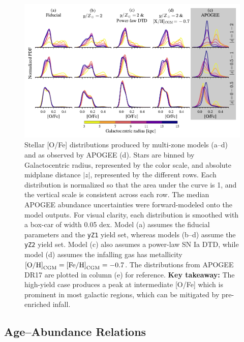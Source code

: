 \documentclass[twocolumn,twocolappendix,linenumbers]{aastex631}
\begin{document}
\begin{figure}
    \centering
    \includegraphics{src/tex/figures/ofe_df_comparison.pdf}
    \caption{Stellar [O/Fe] distributions produced by multi-zone models (a--d) and as observed by APOGEE (d). Stars are binned by Galactocentric radius, represented by the color scale, and absolute midplane distance $|z|$, represented by the different rows. Each distribution is normalized so that the area under the curve is 1, and the vertical scale is consistent across each row. The median APOGEE abundance uncertainties were forward-modeled onto the model outputs. For visual clarity, each distribution is smoothed with a box-car of width 0.05 dex. Model (a) assumes the fiducial parameters and the {\tt yZ1} yield set, whereas models (b--d) assume the {\tt yZ2} yield set. Model (c) also assumes a power-law SN Ia DTD, while model (d) assumes the infalling gas has metallicity ${\rm [O/H]}_{\rm CGM}={\rm [Fe/H]}_{\rm CGM}=-0.7$. The distributions from APOGEE DR17 are plotted in column (e) for reference. {\bf Key takeaway:} The high-yield case produces a peak at intermediate [O/Fe] which is prominent in most galactic regions, which can be mitigated by pre-enriched infall.}
    \label{fig:ofe-df-yields}
\end{figure}

\subsection{Age--Abundance Relations}
\end{document}
